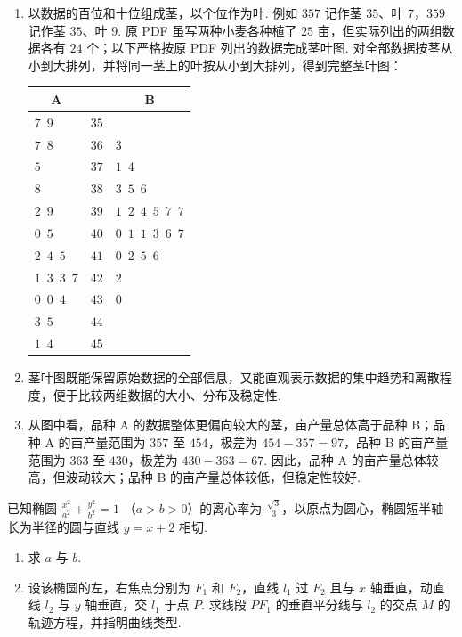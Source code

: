 \begin{solution}
\begin{enumerate}
\item 以数据的百位和十位组成茎，以个位作为叶. 例如 \(357\) 记作茎 \(35\)、叶 \(7\)，\(359\) 记作茎 \(35\)、叶 \(9\). 原 PDF 虽写两种小麦各种植了 \(25\) 亩，但实际列出的两组数据各有 \(24\) 个；以下严格按原 PDF 列出的数据完成茎叶图. 对全部数据按茎从小到大排列，并将同一茎上的叶按从小到大排列，得到完整茎叶图：

\begin{center}
\begin{tabular}{p{3.5cm}|c|p{3.5cm}}
\multicolumn{1}{c|}{A} & & \multicolumn{1}{c}{B} \\
\hline
\(7\enspace9\) & \(35\) & \\
\(7\enspace8\) & \(36\) & \(3\) \\
\(5\) & \(37\) & \(1\enspace4\) \\
\(8\) & \(38\) & \(3\enspace5\enspace6\) \\
\(2\enspace9\) & \(39\) & \(1\enspace2\enspace4\enspace5\enspace7\enspace7\) \\
\(0\enspace5\) & \(40\) & \(0\enspace1\enspace1\enspace3\enspace6\enspace7\) \\
\(2\enspace4\enspace5\) & \(41\) & \(0\enspace2\enspace5\enspace6\) \\
\(1\enspace3\enspace3\enspace7\) & \(42\) & \(2\) \\
\(0\enspace0\enspace4\) & \(43\) & \(0\) \\
\(3\enspace5\) & \(44\) & \\
\(1\enspace4\) & \(45\) & \\
\end{tabular}
\end{center}
\item 茎叶图既能保留原始数据的全部信息，又能直观表示数据的集中趋势和离散程度，便于比较两组数据的大小、分布及稳定性.
\item 从图中看，品种 A 的数据整体更偏向较大的茎，亩产量总体高于品种 B；品种 A 的亩产量范围为 \(357\) 至 \(454\)，极差为 \(454-357=97\)，品种 B 的亩产量范围为 \(363\) 至 \(430\)，极差为 \(430-363=67\). 因此，品种 A 的亩产量总体较高，但波动较大；品种 B 的亩产量总体较低，但稳定性较好.
\end{enumerate}
\end{solution}

\begin{problem}
已知椭圆 \(\frac{x^2}{a^2} + \frac{y^2}{b^2} = 1 \) （\(a > b > 0\)）的离心率为 \(\frac{\sqrt{3}}{3}\)，以原点为圆心，椭圆短半轴长为半径的圆与直线 \(y = x + 2\) 相切.
\begin{enumerate}
\item 求 \(a\) 与 \(b\).
\item 设该椭圆的左，右焦点分别为 \(F_{1}\) 和 \(F_{2}\)，直线 \(l_{1}\) 过 \(F_{2}\) 且与 \(x\) 轴垂直，动直线 \(l_{2}\) 与 \(y\) 轴垂直，交 \(l_{1}\) 于点 \(P\). 求线段 \(PF_{1}\) 的垂直平分线与 \(l_{2}\) 的交点 \(M\) 的轨迹方程，并指明曲线类型.
\end{enumerate}
\end{problem}

